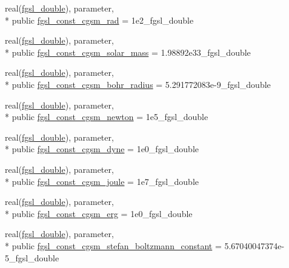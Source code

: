 \begin{DoxyCompactItemize}
\item 
real(\hyperlink{classfgsl_a9af5113378e0f000eb479d3f90196ddf}{fgsl\-\_\-double}), parameter, \\*
public \hyperlink{classfgsl_aa616f1f47c1a107f10dcb7418517b723}{fgsl\-\_\-const\-\_\-cgsm\-\_\-rad} = 1e2\-\_\-fgsl\-\_\-double
\item 
real(\hyperlink{classfgsl_a9af5113378e0f000eb479d3f90196ddf}{fgsl\-\_\-double}), parameter, \\*
public \hyperlink{classfgsl_a41afd20c5be47db2d713c42cac018572}{fgsl\-\_\-const\-\_\-cgsm\-\_\-solar\-\_\-mass} = 1.\-98892e33\-\_\-fgsl\-\_\-double
\item 
real(\hyperlink{classfgsl_a9af5113378e0f000eb479d3f90196ddf}{fgsl\-\_\-double}), parameter, \\*
public \hyperlink{classfgsl_a61da4815b82a64d0b0a2a5737ee854f5}{fgsl\-\_\-const\-\_\-cgsm\-\_\-bohr\-\_\-radius} = 5.\-291772083e-\/9\-\_\-fgsl\-\_\-double
\item 
real(\hyperlink{classfgsl_a9af5113378e0f000eb479d3f90196ddf}{fgsl\-\_\-double}), parameter, \\*
public \hyperlink{classfgsl_a1130bb96c29d828c350ca8882cac2a6d}{fgsl\-\_\-const\-\_\-cgsm\-\_\-newton} = 1e5\-\_\-fgsl\-\_\-double
\item 
real(\hyperlink{classfgsl_a9af5113378e0f000eb479d3f90196ddf}{fgsl\-\_\-double}), parameter, \\*
public \hyperlink{classfgsl_a9d4d18eee80940b4fda61ccf8eb7a0a1}{fgsl\-\_\-const\-\_\-cgsm\-\_\-dyne} = 1e0\-\_\-fgsl\-\_\-double
\item 
real(\hyperlink{classfgsl_a9af5113378e0f000eb479d3f90196ddf}{fgsl\-\_\-double}), parameter, \\*
public \hyperlink{classfgsl_adea52d494e1c4e17f003736bd07eb592}{fgsl\-\_\-const\-\_\-cgsm\-\_\-joule} = 1e7\-\_\-fgsl\-\_\-double
\item 
real(\hyperlink{classfgsl_a9af5113378e0f000eb479d3f90196ddf}{fgsl\-\_\-double}), parameter, \\*
public \hyperlink{classfgsl_aa30f1017800c569944ad894fff2ae006}{fgsl\-\_\-const\-\_\-cgsm\-\_\-erg} = 1e0\-\_\-fgsl\-\_\-double
\item 
real(\hyperlink{classfgsl_a9af5113378e0f000eb479d3f90196ddf}{fgsl\-\_\-double}), parameter, \\*
public \hyperlink{classfgsl_a7b2b26a4a33ccd17f26be17db533b3ac}{fgsl\-\_\-const\-\_\-cgsm\-\_\-stefan\-\_\-boltzmann\-\_\-constant} = 5.\-67040047374e-\/5\-\_\-fgsl\-\_\-double
\item 

\end{DoxyCompactItemize}
